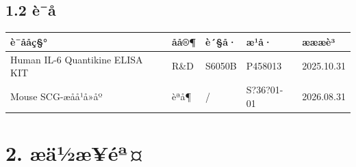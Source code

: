 \documentclass[UTF8,10pt,a4paper,fontset=fandol]{ctexart}
\newcommand{\fieldvalue}[1]{#1}
\newcommand{\handwritten}[1]{#1}
\begin{document}
\subsection*{1.2 è¯å}

\begin{tabularx}{\textwidth}{|X|p{2.5cm}|p{2.5cm}|p{2.5cm}|}
\hline
è¯ååç§° & åå®¶ & è´§å· & æ¹å· & æææè³ \\
\hline
Human IL-6 Quantikine ELISA KIT & R\&D & S6050B &
\fieldvalue{\handwritten{P458013}} &
\fieldvalue{\handwritten{2025.10.31}} \\
\hline
Mouse SCG-æåå¹å»åº & èªå¶ & / &
\fieldvalue{\handwritten{S?36?01-01}} &
\fieldvalue{\handwritten{2026.08.31}} \\
\hline
\end{tabularx}

\section*{2. æä½æ­¥éª¤}
\end{document}
